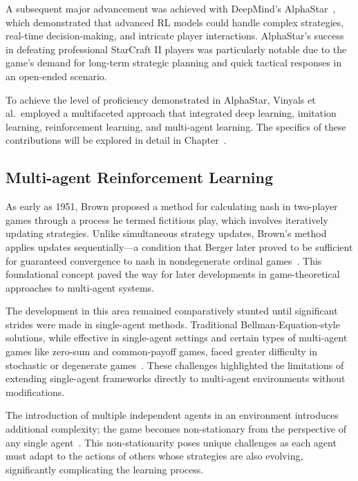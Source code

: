 A subsequent major advancement was achieved with DeepMind's AlphaStar~\cite{vinyals2019},
which demonstrated that advanced RL models could handle complex strategies,
real-time decision-making, and intricate player interactions. AlphaStar's success in 
defeating professional StarCraft II players was particularly notable due to the game's demand 
for long-term strategic planning and quick tactical responses in an open-ended scenario.

To achieve the level of proficiency demonstrated in AlphaStar, Vinyals et al.~employed a 
multifaceted approach that integrated deep learning, imitation learning, reinforcement learning, 
and multi-agent learning. The specifics of these contributions will be explored in 
detail in Chapter~.









\subsection*{Multi-agent Reinforcement Learning}

As early as 1951, Brown proposed a method for calculating \gls{nash} in two-player games 
through a process he termed fictitious play, which involves iteratively updating strategies. 
Unlike simultaneous strategy updates, Brown's method applies updates sequentially—a condition 
that Berger later proved to be sufficient for guaranteed convergence to \gls{nash} in 
nondegenerate ordinal games~\cite{brown1951iterative, berger2005, berger2007}. 
This foundational concept paved the way for later developments in game-theoretical 
approaches to multi-agent systems.

The development in this area remained comparatively stunted until significant 
strides were made in single-agent methods. Traditional Bellman-Equation-style solutions, 
while effective in single-agent settings and certain types of multi-agent games like zero-sum and 
common-payoff games, faced greater difficulty in stochastic or degenerate games~\cite{shoham2007a}.
These challenges highlighted the limitations of extending single-agent frameworks directly to 
multi-agent environments without modifications.

The introduction of multiple independent agents in an environment introduces additional complexity;
the game becomes non-stationary from the perspective of any single agent~\cite{busoniu2008}. 
This non-stationarity poses unique challenges as each agent must adapt to the actions of others 
whose strategies are also evolving, significantly complicating the learning process.

